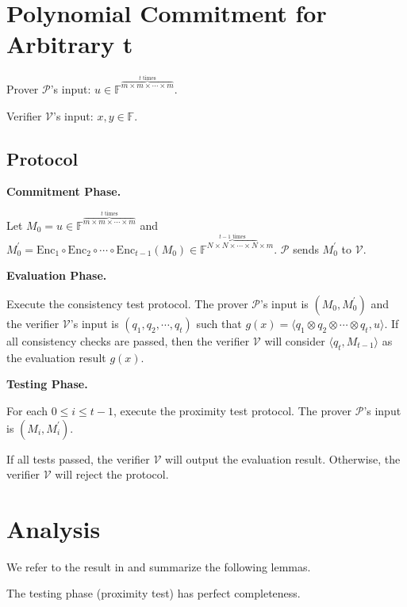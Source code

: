 \section{Polynomial Commitment for Arbitrary t}

Prover $\mathcal{P}$'s input: $u \in \mathbb{F}^{\overbrace{m \times m \times \cdots \times m}^{t \text{ times}}}$.

Verifier $\mathcal{V}$'s input: $x, y \in \mathbb{F}$.

\subsection{Protocol}

\textbf{Commitment Phase.}

Let $M_0 = u \in \mathbb{F}^{\overbrace{m \times m \times \cdots \times m}^{t \text{ times}}}$ and $ M_0^{\prime} = \text{Enc}_1 \circ \text{Enc}_2 \circ \cdots \circ \text{Enc}_{t-1} (M_0) \in \mathbb{F}^{\overbrace{N \times N \times \cdots \times N}^{t-1 \text{ times}} \times m}$. $\mathcal{P}$ sends $M_0^{\prime}$ to $\mathcal{V}$.

\textbf{Evaluation Phase.}

Execute the consistency test protocol. The prover $\mathcal{P}$'s input is $(M_0, M_0^{\prime})$ and the verifier $\mathcal{V}$'s input is $(q_1, q_2, \cdots, q_t)$ such that $g(x) =\langle q_1 \otimes q_2 \otimes \cdots \otimes q_t, u \rangle $.
If all consistency checks are passed, then the verifier $\mathcal{V}$ will consider $\langle q_t, M_{t-1} \rangle$ as the evaluation result $g(x)$. 

\textbf{Testing Phase.}

For each $0 \le i \le t-1$, execute the proximity test protocol. The prover $\mathcal{P}$'s input is $(M_i, M_i^{\prime})$.

If all tests passed, the verifier $\mathcal{V}$ will output the evaluation result. Otherwise, the verifier $\mathcal{V}$ will reject the protocol.

\section{Analysis}

We refer to the result in \cite{cryptoeprint:2020/1426} and summarize the following lemmas. 

\begin{lemma}
\label{lemma:pc-completeness}
The testing phase (proximity test) has perfect completeness.
\end{lemma}

